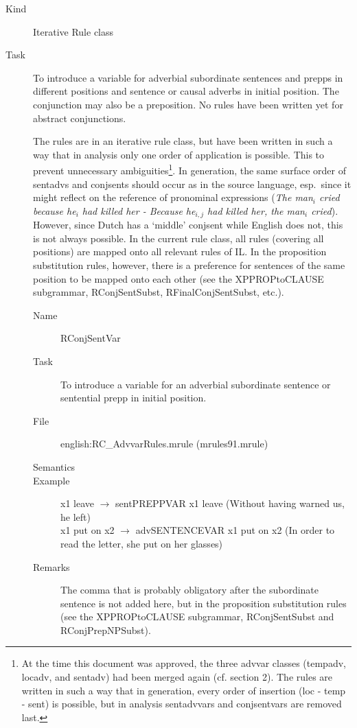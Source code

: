 \begin{description}
\item[Kind] Iterative Rule class
\item[Task] To introduce a variable for adverbial subordinate sentences and 
prepps in 
different positions and sentence or causal adverbs in 
initial position. The conjunction may also be a preposition. No rules have 
been written yet for abstract conjunctions. 

The rules are in an iterative rule class, but have been written in such a way 
that in analysis only one order of application is possible. This to prevent 
unnecessary ambiguities\footnote{At the time this document 
was approved, the three advvar classes (tempadv, locadv, and sentadv) had been 
merged again (cf. section 2). The rules are 
written in such a way that in generation, every order of insertion (loc - temp 
- sent) is possible, but in analysis sentadvvars and conjsentvars are removed 
last.}. In generation, the same surface order of sentadvs and conjsents should 
occur as in the source language, esp.\ since it might reflect on the reference 
of pronominal expressions ({\em The man$_{i}$ cried because he$_{i}$ had killed
her - Because he$_{i,j}$ had killed her, the man$_{i}$ cried\/}). 
However, since Dutch has a `middle' conjsent 
while English does not, this is not always possible. In the current rule class, 
all rules (covering all positions) are mapped onto all relevant rules of IL. 
In the proposition substitution rules, however, there is a preference for 
sentences of the same position to be mapped onto each other (see the 
XPPROPtoCLAUSE subgrammar, RConjSentSubst, RFinalConjSentSubst, etc.).

\vspace{1 cm}
\begin{description}
\item[Name] RConjSentVar
\item[Task] To introduce a variable for an adverbial subordinate sentence or 
sentential prepp in initial position.
\item[File] english:RC\_AdvvarRules.mrule (mrules91.mrule)
\item[Semantics]
\item[Example] x1 leave $\rightarrow$ sentPREPPVAR x1 leave (Without having 
warned us, he left)\\
x1 put on x2 $\rightarrow$ advSENTENCEVAR x1 put on x2 (In order to read the 
letter, she put on her glasses)
\item[Remarks] The comma that is probably obligatory after the subordinate 
sentence is not added here, but in the proposition substitution rules (see 
the XPPROPtoCLAUSE subgrammar, RConjSentSubst and RConjPrepNPSubst).


\end{description}
\end{description}
